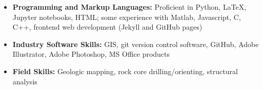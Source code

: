 \documentclass[11pt,a4paper,sans]{moderncv}
\begin{document}
\begin{itemize}

    

    \item \textbf{Programming and Markup Languages:} Proficient in Python,
        {\selectfont\LaTeX}, Jupyter notebooks, HTML; some
        experience with  Matlab, Javascript, C, C{++}, frontend web development
        (Jekyll and GitHub pages)

    \vspace{6pt}

    \item \textbf{Industry Software Skills:} GIS, git version control software,
        GitHub, Adobe Illustrator, Adobe Photoshop, MS Office products

    \vspace{6pt}

    \item \textbf{Field Skills:} Geologic mapping, rock core drilling/orienting,
        structural analysis

\end{itemize}
\end{document}
